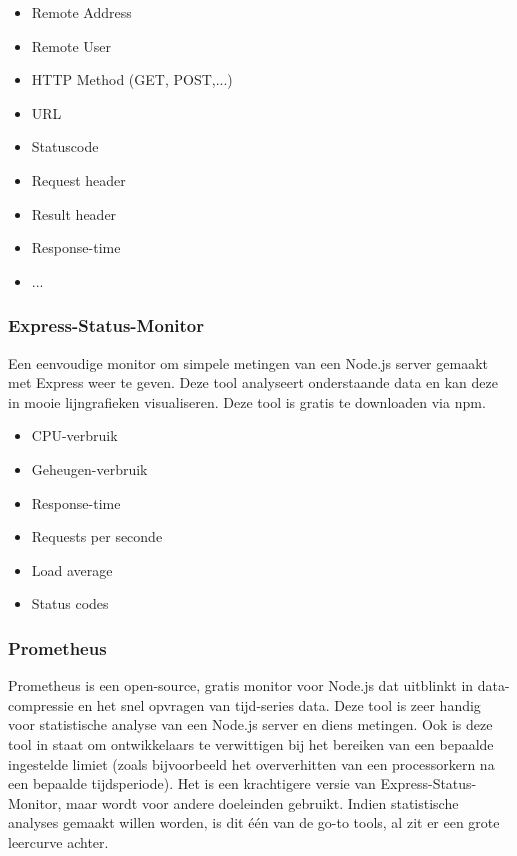 \begin{itemize}
	\item Remote Address
	\item Remote User
	\item HTTP Method (GET, POST,...)
	\item URL
	\item Statuscode
	\item Request header
	\item Result header
	\item Response-time
	\item ...
\end{itemize}

\subsubsection{Express-Status-Monitor}
\label{sec:statusMonitor}

Een eenvoudige monitor om simpele metingen van een Node.js server gemaakt met Express weer te geven. Deze tool analyseert onderstaande data en kan deze in mooie lijngrafieken visualiseren. Deze tool is gratis te downloaden via npm.

\begin{itemize}
	\item CPU-verbruik
	\item Geheugen-verbruik
	\item Response-time
	\item Requests per seconde
	\item Load average
	\item Status codes
\end{itemize}

\subsubsection{Prometheus}
\label{sec:prometheus}

Prometheus is een open-source, gratis monitor voor Node.js dat uitblinkt in data-compressie en het snel opvragen van tijd-series data. Deze tool is zeer handig voor statistische analyse van een Node.js server en diens metingen. Ook is deze tool in staat om ontwikkelaars te verwittigen bij het bereiken van een bepaalde ingestelde limiet (zoals bijvoorbeeld het oververhitten van een processorkern na een bepaalde tijdsperiode). Het is een krachtigere versie van Express-Status-Monitor, maar wordt voor andere doeleinden gebruikt. Indien statistische analyses gemaakt willen worden, is dit één van de go-to tools, al zit er een grote leercurve achter.

